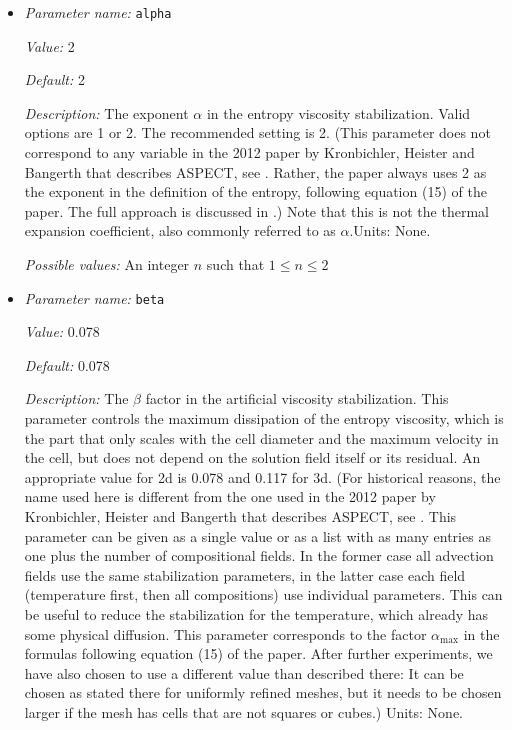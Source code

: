 \begin{itemize}
{\it Possible values:} A boolean value (true or false)
\item {\it Parameter name:} {\tt alpha}
\label{parameters:Discretization/Stabilization parameters/alpha}


{\it Value:} 2


{\it Default:} 2


{\it Description:} The exponent $\alpha$ in the entropy viscosity stabilization. Valid options are 1 or 2. The recommended setting is 2. (This parameter does not correspond to any variable in the 2012 paper by Kronbichler, Heister and Bangerth that describes ASPECT, see \cite{KHB12}. Rather, the paper always uses 2 as the exponent in the definition of the entropy, following equation (15) of the paper. The full approach is discussed in \cite{GPP11}.) Note that this is not the thermal expansion coefficient, also commonly referred to as $\alpha$.Units: None.


{\it Possible values:} An integer $n$ such that $1\leq n \leq 2$
\item {\it Parameter name:} {\tt beta}
\label{parameters:Discretization/Stabilization parameters/beta}


{\it Value:} 0.078


{\it Default:} 0.078


{\it Description:} The $\beta$ factor in the artificial viscosity stabilization. This parameter controls the maximum dissipation of the entropy viscosity, which is the part that only scales with the cell diameter and the maximum velocity in the cell, but does not depend on the solution field itself or its residual. An appropriate value for 2d is 0.078 and 0.117 for 3d. (For historical reasons, the name used here is different from the one used in the 2012 paper by Kronbichler, Heister and Bangerth that describes ASPECT, see \cite{KHB12}. This parameter can be given as a single value or as a list with as many entries as one plus the number of compositional fields. In the former case all advection fields use the same stabilization parameters, in the latter case each field (temperature first, then all compositions) use individual parameters. This can be useful to reduce the stabilization for the temperature, which already has some physical diffusion. This parameter corresponds to the factor $\alpha_{\text{max}}$ in the formulas following equation (15) of the paper. After further experiments, we have also chosen to use a different value than described there: It can be chosen as stated there for uniformly refined meshes, but it needs to be chosen larger if the mesh has cells that are not squares or cubes.) Units: None.



\end{itemize}
